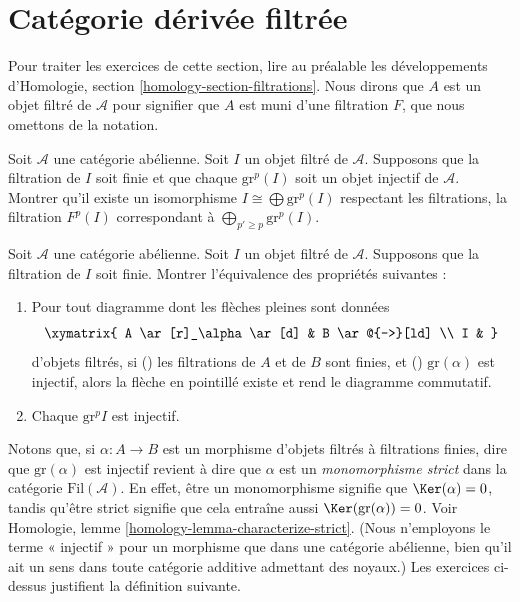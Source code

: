 \section{Catégorie dérivée filtrée}
\label{section-filtered-derived}

\noindent
Pour traiter les exercices de cette section, lire au préalable les développements
d'Homologie, section \ref{homology-section-filtrations}. Nous dirons que
$A$ est un objet filtré de $\mathcal{A}$ pour signifier que $A$ est muni
d'une filtration $F$, que nous omettons de la notation.

\begin{exercise}
\label{exercise-split-injective}
Soit $\mathcal{A}$ une catégorie abélienne.
Soit $I$ un objet filtré de $\mathcal{A}$.
Supposons que la filtration de $I$ soit finie
et que chaque $\text{gr}^p(I)$ soit un objet injectif de $\mathcal{A}$.
Montrer qu'il existe un isomorphisme
$I \cong \bigoplus \text{gr}^p(I)$ respectant les filtrations, la filtration
$F^p(I)$ correspondant à $\bigoplus_{p' \geq p} \text{gr}^p(I)$.
\end{exercise}

\begin{exercise}
\label{exercise-filtered-injective}
Soit $\mathcal{A}$ une catégorie abélienne.
Soit $I$ un objet filtré de $\mathcal{A}$.
Supposons que la filtration de $I$ soit finie.
Montrer l'équivalence des propriétés suivantes :
\begin{enumerate}
\item Pour tout diagramme dont les flèches pleines sont données
$$
\xymatrix{
A \ar[r]_\alpha \ar[d] & B \ar@{-->}[ld] \\
I &
}
$$
d'objets filtrés, si
() les filtrations de $A$ et de $B$ sont finies,
et () $\text{gr}(\alpha)$ est injectif, alors la
flèche en pointillé existe et rend le diagramme commutatif.
\item Chaque $\text{gr}^p I$ est injectif.
\end{enumerate}
\end{exercise}

\noindent
Notons que, si $\alpha : A \to B$ est un morphisme d'objets filtrés
à filtrations finies, dire que $\text{gr}(\alpha)$ est injectif
revient à dire que $\alpha$ est un {\it monomorphisme strict}
dans la catégorie $\text{Fil}(\mathcal{A})$. En effet,
être un monomorphisme signifie que $\Ker(\alpha) = 0$, tandis qu'être strict signifie que
cela entraîne aussi $\Ker(\text{gr}(\alpha)) = 0$.
Voir Homologie, lemme \ref{homology-lemma-characterize-strict}.
(Nous n'employons le terme « injectif » pour un morphisme que dans une catégorie abélienne,
bien qu'il ait un sens dans toute catégorie additive admettant des noyaux.)
Les exercices ci-dessus justifient la définition suivante.

